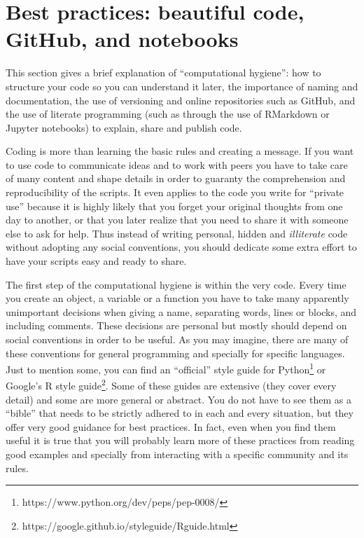 \section{Best practices: beautiful code, GitHub, and notebooks}
\label{sec:practices}


This section gives a brief explanation of ``computational hygiene'': how to structure your code so you can understand it later, the importance of naming and documentation, the use of versioning and online repositories such as GitHub, and the use of literate programming (such as through the use of RMarkdown or Jupyter notebooks) to explain, share and publish code.

Coding is more than learning the basic rules and creating a message. If you want to use code to communicate ideas and to work with peers you have to take care of many content and shape details in order to guaranty the comprehension and reproducibility of the scripts. It even applies to the code you write for ``private use'' because it is highly likely that you forget your original thoughts from one day to another, or that you later realize that you need to share it with someone else to ask for help. Thus instead of writing personal, hidden and \textit{illiterate} code without adopting any social conventions, you should dedicate some extra effort to have your scripts easy and ready to share.

The first step of the computational hygiene is within the very code. Every time you create an object, a variable or a function you have to take many apparently unimportant decisions when giving a name, separating words, lines or blocks, and including comments. These decisions are personal but mostly should depend on social conventions in order to be useful. As you may imagine, there are many of these conventions for general programming and specially for specific languages. Just to mention some, you can find an ``official'' style guide for Python\footnote{https://www.python.org/dev/peps/pep-0008/}  or Google's R style guide\footnote{https://google.github.io/styleguide/Rguide.html}. Some of these guides are extensive (they cover every detail) and some are more general or abstract. You do not have to see them as a ``bible'' that needs to be strictly adhered to in each and every situation, but they offer very good guidance for best practices. In fact, even when you find them useful it is true that you will probably learn more of these practices from reading good examples and specially from interacting with a specific community and its rules.

